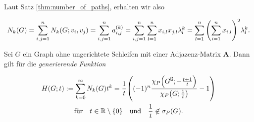 \begin{remark}
                Laut Satz \ref{thm:number_of_paths}, erhalten wir also

                \begin{align*}
                    N_k(G)
                    =
                    \sum_{i,j=1}^n
                        N_k(G; v_i, v_j)
                    =
                    \sum_{i,j=1}^n
                        a_{i, j}^{(k)}
                    =
                    \sum_{i,j=1}^n
                        \sum_{l=1}^n
                        x_{i,l} x_{j,l} \lambda_l^k
                    =
                    \sum_{l=1}^n
                        {\left ( 
                            \sum_{i=1}^n
                                x_{i,l}
                         \right )}^2
                        \lambda_l^k.
                \end{align*}

            \end{remark}

            \begin{proposition}

                Sei $G$ ein Graph ohne ungerichtete Schleifen mit einer Adjazenz-Matrix $\mathbf A$.
                Dann gilt für die \textit{generierende Funktion}

                \begin{multline*}
                    H(G; t)
                    :=
                    \sum_{k=0}^\infty N_k(G) t^k
                    =
                    \frac{1}{t}
                    {\left ( 
                        (-1)^n
                        \frac
                        {
                            \chi_P
                            {\left ( 
                                G^\complement;
                                -\frac{t+1}{t}
                             \right )}
                        }{
                            \chi_P
                            {\left ( 
                                G;
                                \frac{1}{t}
                             \right )}
                        }
                        -
                        1
                     \right )} \\
                    \text{für}
                    \quad
                    t \in \mathbb R \setminus {\left \{ 0 \right \}}
                    \quad
                    \text{und}
                    \quad
                    \frac{1}{t} \not \in \sigma_P(G).
                \end{multline*}

            \end{proposition}

